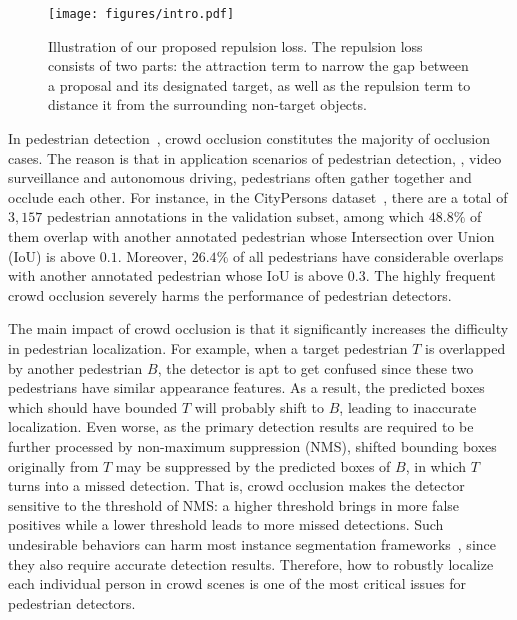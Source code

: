 \documentclass[10pt,twocolumn,letterpaper]{article}
\begin{document}
\begin{figure}[!htp]
\texttt{[image: figures/intro.pdf]}
\caption{Illustration of our proposed repulsion loss. The repulsion loss consists of two parts: the attraction term to narrow the gap between a proposal and its designated target, as well as the repulsion term to distance it from the surrounding non-target objects.}
\label{fig:intro}
\end{figure}

In pedestrian detection~\cite{zhang2016far,hosang2015taking,dollar2009integral,dollar2014fast,dollar2009pedestrian,mao2017can}, crowd occlusion constitutes the majority of occlusion cases. The reason is that in application scenarios of pedestrian detection, \eg, video surveillance and autonomous driving, pedestrians often gather together and occlude each other. For instance, in the CityPersons dataset~\cite{zhang2017citypersons}, there are a total of $3,157$ pedestrian annotations in the validation subset, among which $48.8\%$ of them overlap with another annotated pedestrian whose Intersection over Union (IoU) is above $0.1$. Moreover, $26.4\%$ of all pedestrians have considerable overlaps with another annotated pedestrian whose IoU is above $0.3$. The highly frequent crowd occlusion severely harms the performance of pedestrian detectors.

The main impact of crowd occlusion is that it significantly increases the difficulty in pedestrian localization. For example, when a target pedestrian $T$ is overlapped by another pedestrian $B$, the detector is apt to get confused since these two pedestrians have similar appearance features. As a result, the predicted boxes which should have bounded $T$ will probably shift to $B$, leading to inaccurate localization. Even worse, as the primary detection results are required to be further processed by non-maximum suppression (NMS), shifted bounding boxes originally from $T$ may be suppressed by the predicted boxes of $B$, in which $T$ turns into a missed detection. That is, crowd occlusion makes the detector sensitive to the threshold of NMS: a higher threshold brings in more false positives while a lower threshold leads to more missed detections. Such undesirable behaviors can harm most instance segmentation frameworks~\cite{he2017mask,li2017fully}, since they also require accurate detection results. Therefore, how to robustly localize each individual person in crowd scenes is one of the most critical issues for pedestrian detectors.
\end{document}

